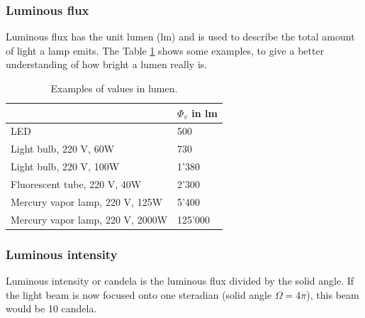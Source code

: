 \subsubsection{Luminous flux}
Luminous flux has the unit lumen (lm) and is used to describe the total amount of light a lamp emits.
The Table \ref{theory:lumflux} shows some examples, to give a better understanding of how bright a lumen really is.
\begin{table}[ht]
\begin{tabular}{ |p{12cm}| p{2cm}|  }
	\hline
	& $\Phi_v$ in lm\\
	
	
	\hline
	LED		& 500\\
	Light bulb, 220 V, 60W		& 730\\
	Light bulb, 220 V, 100W		& 1'380\\
	Fluorescent tube, 220 V, 40W		& 2'300\\
	Mercury vapor lamp, 220 V, 125W		& 5'400\\
	Mercury vapor lamp, 220 V, 2000W		& 125'000\\
	\hline
\end{tabular}
\caption{Examples of values in lumen.\label{theory:lumflux}}
\end{table}

\subsubsection{Luminous intensity}
Luminous intensity or candela is the luminous flux divided by the solid angle.
If the light beam is now focused onto one steradian (solid angle $\Omega = 4\pi$), this beam would be 10 candela.

